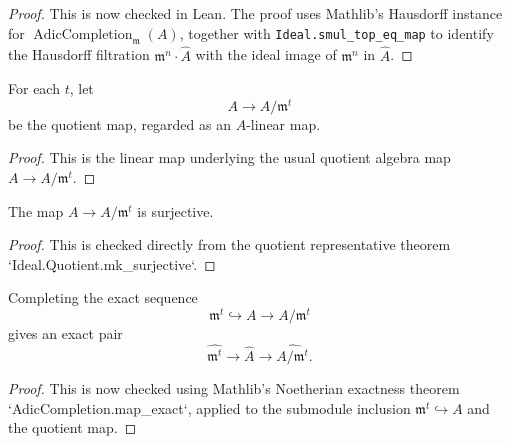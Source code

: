 \begin{proof}
  This is now checked in Lean.  The proof uses Mathlib's Hausdorff instance
  for \(\operatorname{AdicCompletion}_{\mathfrak m}(A)\), together with
  \texttt{Ideal.smul\_top\_eq\_map} to identify the Hausdorff filtration
  \(\mathfrak m^n\cdot\widehat A\) with the ideal image of
  \(\mathfrak m^n\) in \(\widehat A\).
\end{proof}

\begin{definition}
  \label{def:quotient_power_linear_map}
  For each \(t\), let
  \[
    A\to A/\mathfrak m^t
  \]
  be the quotient map, regarded as an \(A\)-linear map.
\end{definition}

\begin{proof}
  This is the linear map underlying the usual quotient algebra map
  \(A\to A/\mathfrak m^t\).
\end{proof}

\begin{lemma}
  \label{lem:quotient_power_linear_map_surjective}
  The map \(A\to A/\mathfrak m^t\) is surjective.
\end{lemma}

\begin{proof}
  This is checked directly from the quotient representative theorem
  `Ideal.Quotient.mk\_surjective`.
\end{proof}

\begin{lemma}
  \label{lem:adic_completion_power_quotient_exact}
  Completing the exact sequence
  \[
    \mathfrak m^t\hookrightarrow A\to A/\mathfrak m^t
  \]
  gives an exact pair
  \[
    \widehat{\mathfrak m^t}\to\widehat A
      \to \widehat{A/\mathfrak m^t}.
  \]
\end{lemma}

\begin{proof}
  This is now checked using Mathlib's Noetherian exactness theorem
  `AdicCompletion.map\_exact`, applied to the submodule inclusion
  \(\mathfrak m^t\hookrightarrow A\) and the quotient map.
\end{proof}

